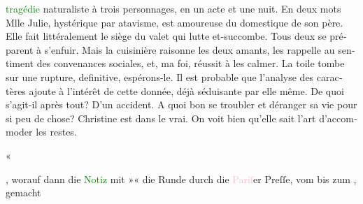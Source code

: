 {{{\begin{otherlanguage}{french}
                           \textcolor{green}{tragédie}
                        naturaliste à trois personnages, en un acte et une nuit. En deux mots Mlle
                        Julie, hystérique par atavisme, est amoureuse du domestique de son père.
                        Elle fait littéralement le siège du valet qui lutte et-succombe. Tous deux
                        se préparent à s’enfuir. Mais la cuisinière raisonne les deux amants, les
                        rappelle au sentiment des convenances sociales, et, ma foi, réussit à les
                        calmer. La toile tombe sur une rupture, definitive, espérons-le. Il est
                        probable que l’analyse des caractères ajoute à l'intérêt de cette donnée,
                        déjà séduisante par elle même. De quoi s’agit-il après tout? D'un accident.
                        A quoi bon se troubler et déranger sa vie pour si peu de chose? Christine
                        est dans le vrai. On voit bien qu'elle sait l'art d'accommoder les
                        restes.\end{otherlanguage}«}}}\label{K_L02669-6h}, worauf dann die \textcolor{green}{Notiz}{} mit »\label{K_L02669-7v}\label{K_L02669-7h}« die Runde durch die \textcolor{pink}{Pariſ}{}\ledrightnote{\textcolor{pink}{Paris}}er Preſſe, vom
                  \label{K_L02669-8v}\label{K_L02669-8h} bis zum \label{K_L02669-666v}\label{K_L02669-666h}, gemacht
